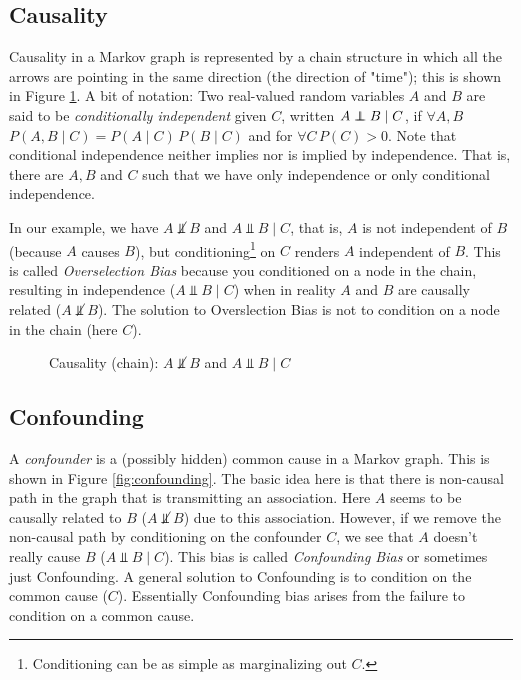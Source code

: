 \documentclass[11pt, oneside]{article}   	%
\newcommand\independent{\protect\mathpalette{\protect\independenT}{\perp}}
\def\independenT#1#2{\mathrel{\rlap{$#1#2$}\mkern2mu{#1#2}}}
\begin{document}
\subsection{Causality}
Causality in a Markov graph is represented by a chain structure in which all the arrows are pointing in the same direction (the direction of "time"); 
 this is shown in Figure \ref{fig:direct}. A bit of notation: Two real-valued random variables $A$ and $B$ are said to be \emph{conditionally independent}
 given $C$, written $A \independent B \mid C$, if $\forall A,B$ $P(A, B \mid C) = P(A \mid C) \, P(B \mid C)$ and for $\forall C \, P(C) > 0$. Note that conditional 
 independence neither implies nor is implied by independence. That is,  there are $A,B$ and $C$ such that we have only independence or only conditional independence.
 
\bigskip
\noindent
In our example, we have  $A \not \Vbar B$ and $A \Vbar B \mid C$, that is, $A$ is not independent of $B$ (because $A$ causes $B$),
but conditioning\footnote{Conditioning can be as simple as marginalizing out $C$.}  on $C$ renders $A$ independent of $B$.  
This is called \emph{Overselection Bias} because you conditioned on a node in the chain, resulting in independence ($A \Vbar B \mid C$) when 
in reality $A$ and $B$ are causally related ($A \not \Vbar B$). The solution to Overslection Bias
is not to condition on a node in the chain (here $C$).

\begin{figure}[b!]
\caption{Causality (chain): $A \not \Vbar B$ and $A \Vbar B \mid C$}
\label{fig:direct}
\end{figure}


\subsection{Confounding}

A  \emph{confounder} is a (possibly hidden) common cause in a Markov graph. This is shown in Figure \ref{fig:confounding}. The basic idea
here is that there is non-causal path in the graph that is transmitting an association. Here $A$ seems to be causally related to  $B$ ($A \not \Vbar B$) due
to this association.  However, if we remove the non-causal path by conditioning on the confounder $C$, we see that $A$ doesn't really cause  
$B$ ($A \Vbar B \mid C$).  This bias is called \emph{Confounding Bias} or 
sometimes just Confounding.  A  general solution to Confounding is to condition on the common cause ($C$).  Essentially Confounding bias arises from
the failure to condition on a common cause.
\end{document}
